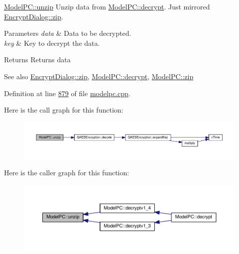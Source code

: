 \hyperlink{class_model_p_c_a6da88f166785a49f73b22c169f956fd0}{Model\+P\+C\+::unzip} Unzip data from \hyperlink{class_model_p_c_a5995215a34a1e1f504035715a8013809}{Model\+P\+C\+::decrypt}. Just mirrored \hyperlink{class_encrypt_dialog_a2bff820a3df4ddc36ecb07ed74b7138a}{Encrypt\+Dialog\+::zip}. 


\begin{DoxyParams}{Parameters}
{\em data} & Data to be decrypted. \\
\hline
{\em key} & Key to decrypt the data. \\
\hline
\end{DoxyParams}
\begin{DoxyReturn}{Returns}
Returns data 
\end{DoxyReturn}
\begin{DoxySeeAlso}{See also}
\hyperlink{class_encrypt_dialog_a2bff820a3df4ddc36ecb07ed74b7138a}{Encrypt\+Dialog\+::zip}, \hyperlink{class_model_p_c_a5995215a34a1e1f504035715a8013809}{Model\+P\+C\+::decrypt}, \hyperlink{class_model_p_c_afebbbfa4b07deba4f68fc6dfb50f353f}{Model\+P\+C\+::zip} 
\end{DoxySeeAlso}


Definition at line \hyperlink{modelpc_8cpp_source_l00879}{879} of file \hyperlink{modelpc_8cpp_source}{modelpc.\+cpp}.



Here is the call graph for this function\+:
\nopagebreak
\begin{figure}[H]
\begin{center}
\leavevmode
\includegraphics[width=350pt]{class_model_p_c_a6da88f166785a49f73b22c169f956fd0_cgraph}
\end{center}
\end{figure}




Here is the caller graph for this function\+:
\nopagebreak
\begin{figure}[H]
\begin{center}
\leavevmode
\includegraphics[width=350pt]{class_model_p_c_a6da88f166785a49f73b22c169f956fd0_icgraph}
\end{center}
\end{figure}


